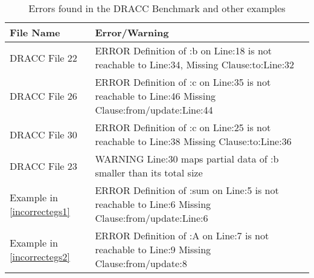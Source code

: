 \vspace{-20pt}
\begin{table}
    \caption{Errors found in the DRACC Benchmark and other examples}
    \label{dracc-errors}
    \begin{center}
        \scriptsize
        \begin{tabular}{ |m{1.5in} | m{3in} |}
            \hline
           File Name & Error/Warning \\ \hline    
           DRACC File 22  & ERROR Definition of :b on Line:18 is not reachable to Line:34, Missing Clause:to:Line:32 \\ \hline    
           DRACC File 26 & ERROR Definition of :c on Line:35 is not reachable to Line:46 Missing Clause:from/update:Line:44 \\ \hline 
           DRACC File 30 & ERROR Definition of :c on Line:25 is not reachable to Line:38 Missing Clause:to:Line:36 \\ \hline 
           DRACC File 23 & WARNING Line:30 maps partial data of :b smaller than its total size   \\ \hline 
           Example in \autoref{incorrectegs1} & 
           ERROR Definition of :sum on Line:5 is not 
           reachable to Line:6 Missing Clause:from/update:Line:6 \\ \hline  
           Example in \autoref{incorrectegs2} &
           ERROR Definition of :A on Line:7 is not 
           reachable to Line:9 Missing Clause:from/update:8
           \\ \hline                              
        \end{tabular}        
    \end{center}
\end{table} \vspace{-30pt}
